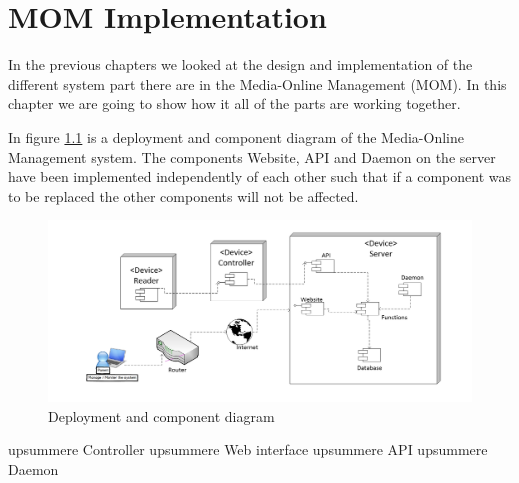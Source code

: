 \chapter{MOM Implementation}

In the previous chapters we looked at the design and implementation of the different system part there are in the Media-Online Management (MOM).
In this chapter we are going to show how it all of the parts are working together.

In figure \ref{fig:deployment} is a deployment and component diagram of the Media-Online Management system. 
The components Website, API and Daemon on the server have been implemented independently of each other such that if a component was to be replaced the other components will not be affected. 
   
\begin{figure}
	\centering
		\includegraphics[width=1.50\textwidth, angle=90 ]{images/deployment.jpg}
	\caption{Deployment and component diagram}
	\label{fig:deployment}
\end{figure}




upsummere Controller 
upsummere Web interface
upsummere API
upsummere Daemon